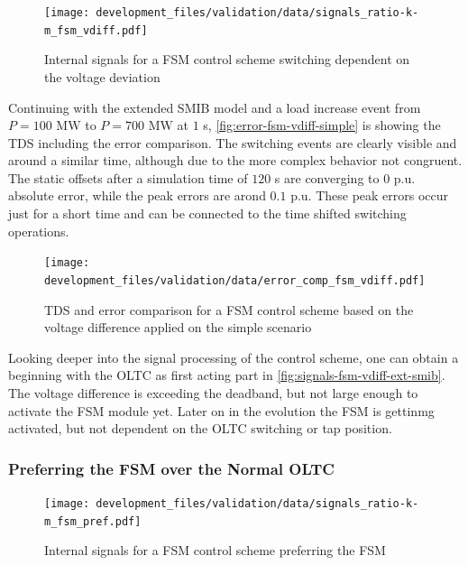 \begin{figure}[htbp!]
    \centering
    \texttt{[image: development\_files/validation/data/signals\_ratio-k-m\_fsm\_vdiff.pdf]}
    \caption[Internal signals for a \acs{FSM} control scheme switching dependent on the voltage deviation]{Internal signals for a \acs{FSM} control scheme switching dependent on the voltage deviation}
    \label{fig:signals-fsm-vdiff-ext-smib}
\end{figure}

Continuing with the extended \acs{SMIB} model and a load increase event from $P=100\text{ MW}$ to $P=700\text{ MW}$ at $1$ s, \autoref{fig:error-fsm-vdiff-simple} is showing the \acs{TDS} including the error comparison.
The switching events are clearly visible and around a similar time, although due to the more complex behavior not congruent.
The static offsets after a simulation time of $120$ s are converging to $0$ p.u. absolute error, while the peak errors are arond $0.1$ p.u.
These peak errors occur just for a short time and can be connected to the time shifted switching operations.

\begin{figure}[htbp!]
    \centering
    \texttt{[image: development\_files/validation/data/error\_comp\_fsm\_vdiff.pdf]}
    \caption[\acs{TDS} and error comparison for a \acs{FSM} control scheme based on the voltage difference applied on the simple scenario]{\acs{TDS} and error comparison for a \acs{FSM} control scheme based on the voltage difference applied on the simple scenario}
    \label{fig:error-fsm-vdiff-simple}
\end{figure}

Looking deeper into the signal processing of the control scheme, one can obtain a beginning with the \acs{OLTC} as first acting part in \autoref{fig:signals-fsm-vdiff-ext-smib}.
The voltage difference is exceeding the deadband, but not large enough to activate the \acs{FSM} module yet.
Later on in the evolution the \acs{FSM} is gettinmg activated, but not dependent on the \acs{OLTC} switching or tap position.

\subsubsection{Preferring the FSM over the Normal OLTC}

\begin{figure}[htbp!]
    \centering
    \texttt{[image: development\_files/validation/data/signals\_ratio-k-m\_fsm\_pref.pdf]}
    \caption[Internal signals for a \acs{FSM} control scheme preferring the \acs{FSM}]{Internal signals  for a \acs{FSM} control scheme preferring the \acs{FSM}}
    \label{fig:signals-fsm-preferred}
\end{figure}

